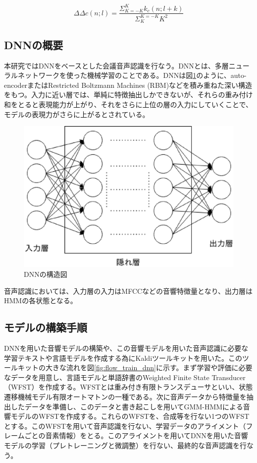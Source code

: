{{\begin{equation}
\label{eq:deltadeltac}
\Delta\Delta c(n;l)=\frac{\Sigma_{K=-K}^{K}k_c(n;l+k)}{\Sigma_{K}^{K=-K}K^2}
\end{equation}
\subsection{DNNの概要\cite{audio_textbook}}
本研究ではDNNをベースとした会議音声認識を行なう。DNNとは、多層ニューラルネットワークを使った機械学習のことである。DNNは図\ref{fig:dnn}のように、auto-encoderまたはRestricted Boltzmann Machines (RBM)などを積み重ねた深い構造をもつ。入力に近い層では、単純に特徴抽出しかできないが、それらの重み付け和をとると表現能力が上がり、それをさらに上位の層の入力にしていくことで、モデルの表現力がさらに上がるとされている。\par

\begin{figure}[H]
  \begin{center}
    \includegraphics[scale=0.5]{./figure/structure_dnn.eps}
  \end{center}
  \caption{DNNの構造図}
  \label{fig:dnn}
\end{figure}

音声認識においては、入力層の入力はMFCCなどの音響特徴量となり、出力層はHMMの各状態となる。

\subsection{モデルの構築手順}}}\par
DNNを用いた音響モデルの構築や、この音響モデルを用いた音声認識に必要な学習テキストや言語モデルを作成する為にKaldiツールキット\cite{kaldi}を用いた。このツールキットの大きな流れを図\ref{fig:flow_train_dnn}に示す。まず学習や評価に必要なデータを用意し、言語モデルと単語辞書のWeighted Finite State Transducer （WFST）を作成する。WFSTとは重み付き有限トランスデューサといい、状態遷移機械モデル有限オートマトンの一種である。次に音声データから特徴量を抽出したデータを準備し、このデータと書き起こしを用いてGMM-HMMによる音響モデルのWFSTを作成する。これらのWFSTを、合成等を行ない1つのWFSTとする。このWFSTを用いて音声認識を行ない、学習データのアライメント（フレームごとの音素情報）をとる。このアライメントを用いてDNNを用いた音響モデルの学習（プレトレーニングと微調整）を行ない、最終的な音声認識を行なう。

